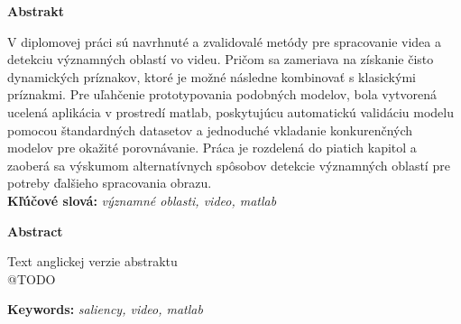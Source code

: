 {\noindent\large\bf Abstrakt}

\vspace{1.8cm}
V diplomovej práci sú navrhnuté a zvalidovalé metódy pre spracovanie videa a detekciu významných oblastí vo videu.
Pričom sa zameriava na získanie čisto dynamických príznakov, ktoré je možné následne kombinovať s klasickými príznakmi.
Pre uľahčenie prototypovania podobných modelov, bola vytvorená ucelená aplikácia v prostredí matlab, poskytujúcu automatickú validáciu modelu pomocou štandardných datasetov a jednoduché vkladanie konkurenčných modelov pre okažité porovnávanie. Práca je rozdelená do piatich kapitol a zaoberá sa výskumom alternatívnych spôsobov detekcie významných oblastí pre potreby ďalšieho spracovania obrazu.
\\

{\parindent0pt \textbf{Kľúčové slová:} \emph{významné oblasti, video, matlab}}

\newpage
 {\noindent\large\bf Abstract}
  \vspace{1.8cm}


Text anglickej verzie abstraktu
\\
@TODO

{\parindent0pt \textbf{Keywords:} \emph{saliency, video, matlab}}


\newpage	
